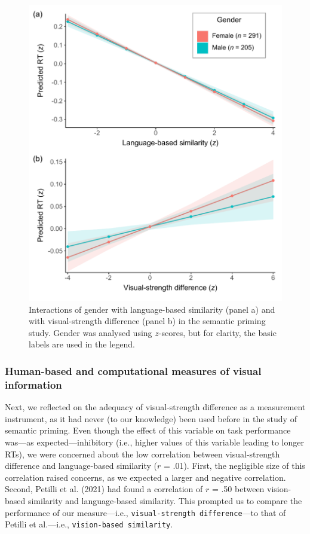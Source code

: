 \documentclass[
  12pt,
  man,floatsintext]{apa7}
\begin{document}
\begin{figure}

{\centering \includegraphics[width=0.8\linewidth]{../semanticpriming/frequentist_analysis/plots/semanticpriming-interactions-with-gender} 

}

\caption{Interactions of gender with language-based similarity (panel a) and with visual-strength difference (panel b) in the semantic priming study. Gender was analysed using $z$-scores, but for clarity, the basic labels are used in the legend.}\label{fig:semanticpriming-interactions-with-gender}
\end{figure}

\hypertarget{results-human-based-and-computational-measures-of-visual-information}{%
\subsubsection{Human-based and computational measures of visual information}\label{results-human-based-and-computational-measures-of-visual-information}}

Next, we reflected on the adequacy of visual-strength difference as a measurement instrument, as it had never (to our knowledge) been used before in the study of semantic priming. Even though the effect of this variable on task performance was---as expected---inhibitory (i.e., higher values of this variable leading to longer RTs), we were concerned about the low correlation between visual-strength difference and language-based similarity (\(r\) = .01). First, the negligible size of this correlation raised concerns, as we expected a larger and negative correlation. Second, Petilli et al. (2021) had found a correlation of \(r\) = .50 between vision-based similarity and language-based similarity. This prompted us to compare the performance of our measure---i.e., \texttt{visual-strength\ difference}---to that of Petilli et al.---i.e., \texttt{vision-based\ similarity}.
\end{document}
